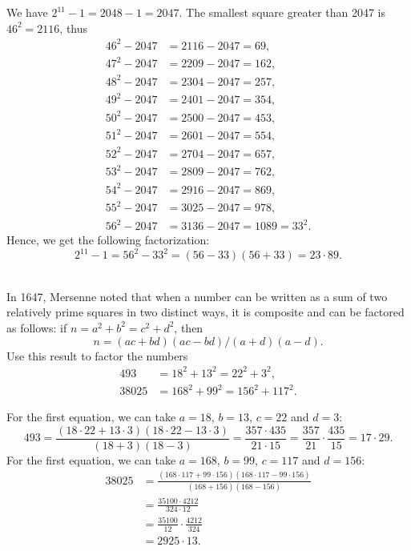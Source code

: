\begin{solution}
    We have $2^{11} - 1 = 2048 - 1 = 2047$. The smallest square greater than 2047 is $46^2 = 2116$, thus
    \begin{align*}
        46^2 - 2047 &= 2116 - 2047 = 69, \\
        47^2 - 2047 &= 2209 - 2047 = 162, \\
        48^2 - 2047 &= 2304 - 2047 = 257, \\
        49^2 - 2047 &= 2401 - 2047 = 354, \\
        50^2 - 2047 &= 2500 - 2047 = 453, \\
        51^2 - 2047 &= 2601 - 2047 = 554, \\
        52^2 - 2047 &= 2704 - 2047 = 657, \\
        53^2 - 2047 &= 2809 - 2047 = 762, \\
        54^2 - 2047 &= 2916 - 2047 = 869, \\
        55^2 - 2047 &= 3025 - 2047 = 978, \\
        56^2 - 2047 &= 3136 - 2047 = 1089 = 33^2.
    \end{align*}
    Hence, we get the following factorization:
    $$2^{11} - 1 = 56^2 - 33^2 = (56 - 33)(56 + 33) = 23 \cdot 89.$$\\
\end{solution}

\begin{exercise}
    In 1647, Mersenne noted that when a number can be written as a sum of two relatively prime squares in two distinct ways, it is composite and can be factored as follows: if $n = a^2 + b^2 = c^2 + d^2$, then
    $$n = (ac + bd)(ac - bd)/(a+d)(a - d).$$
    Use this result to factor the numbers
    \begin{align*}
        493 &= 18^2 + 13^2 = 22^2 + 3^2, \\
        38025 &= 168^2 + 99^2 = 156^2 + 117^2.
    \end{align*}
\end{exercise}

\begin{solution}
    For the first equation, we can take $a = 18$, $b = 13$, $c = 22$ and $d = 3$:
    $$493 = \frac{(18\cdot 22 + 13 \cdot 3)(18\cdot 22 - 13 \cdot 3)}{(18 + 3)(18 - 3)} = \frac{357 \cdot 435}{21 \cdot 15} = \frac{357}{21} \cdot \frac{435}{15} = 17 \cdot 29.$$
    For the first equation, we can take $a = 168$, $b = 99$, $c = 117$ and $d = 156$:
    \begin{align*}
        38025 &= \frac{(168 \cdot 117 + 99 \cdot 156)(168 \cdot 117 - 99 \cdot 156)}{(168 + 156)(168 - 156)} \\
        &= \frac{35100 \cdot 4212}{324 \cdot 12} \\
        &= \frac{35100}{12} \cdot \frac{4212}{324} \\
        &= 2925 \cdot 13.
    \end{align*}
\end{solution}